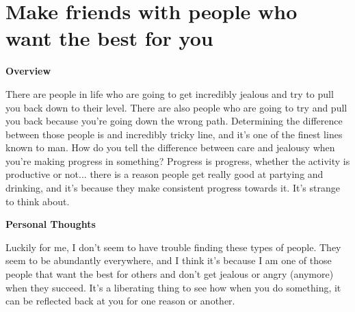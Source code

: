\documentclass{article}
\begin{document}
\section{Make friends with people who want the best for you}
     \begin{multicols}{2}
        \begin{center}
            \textbf{Overview}
        \end{center}
        
        There are people in life who are going to get incredibly jealous and try to pull you back down to their level. There are also people who are going to try and pull you back because you're going down the wrong path. Determining the difference between those people is and incredibly tricky line, and it's one of the finest lines known to man. How do you tell the difference between care and jealousy when you're making progress in something? Progress is progress, whether the activity is productive or not... there is a reason people get really good at partying and drinking, and it's because they make consistent progress towards it. It's strange to think about.

        \begin{center}
            \textbf{Personal Thoughts}
        \end{center}
        
        Luckily for me, I don't seem to have trouble finding these types of people. They seem to be abundantly everywhere, and I think it's because I am one of those people that want the best for others and don't get jealous or angry (anymore) when they succeed. It's a liberating thing to see how when you do something, it can be reflected back at you for one reason or another.
        
    \end{multicols}
\end{document}
